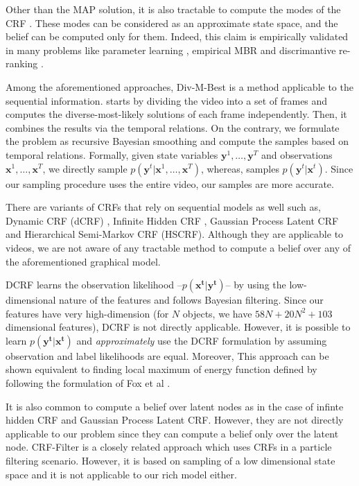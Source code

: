 Other than the MAP solution, it is also tractable to compute the modes of the CRF \cite{divmbest,mbest,mmode}. These modes can be considered as an approximate state space, and the belief can be computed only for them. Indeed, this claim is empirically validated in many problems like parameter learning \cite{mlparam}, empirical MBR \cite{embr} and discrimantive re-ranking \cite{rerank}.

Among the aforementioned approaches, Div-M-Best \cite{divmbest} is a method applicable to the sequential information. \cite{divmbest} starts by dividing the video into a set of frames and computes the diverse-most-likely solutions of each frame independently. Then, it combines the results via the temporal relations. On the contrary, we formulate the problem as recursive Bayesian smoothing and compute the samples based on temporal relations. Formally, given state variables $\mathbf{y}^1,\ldots,\mathbf{y}^T$ and observations $\mathbf{x}^1,\ldots,\mathbf{x}^T$, we directly sample $p(\mathbf{y}^t|\mathbf{x}^1,\ldots,\mathbf{x}^T)$, whereas, \cite{divmbest} samples $p(\mathbf{y}^t|\mathbf{x}^t)$. Since our sampling procedure uses the entire video, our samples are more accurate.

There are variants of CRFs that rely on sequential models as well such as, Dynamic CRF (dCRF) \cite{dcrf}, Infinite Hidden CRF \cite{ihcrf}, Gaussian Process Latent CRF \cite{gpcrf} and Hierarchical Semi-Markov CRF (HSCRF). Although they are applicable to videos, we are not aware of any tractable method to compute a belief over any of the aforementioned graphical model.

DCRF \cite{ddcrf} learns the observation likelihood --$p(\mathbf{x^t}|\mathbf{y^t})$-- by using the low-dimensional nature of the features and follows Bayesian filtering. Since our features have very high-dimension (for $N$ objects, we have $58N+20N^2+103$ dimensional features), DCRF \cite{ddcrf} is not directly applicable. However, it is possible to learn $p(\mathbf{y^t}|\mathbf{x^t})$ and \emph{approximately} use the DCRF formulation by assuming observation and label likelihoods are equal. Moreover, This approach can be shown equivalent to finding local maximum of energy function defined by \cite{hemaIJRR} following the formulation of Fox et al \cite{foxThesis}.

It is also common to compute a belief over latent nodes as in the case of infinte hidden CRF \cite{ihcrf} and Gaussian Process Latent CRF\cite{gpcrf}. However, they are not directly applicable to our problem since they can compute a belief only over the latent node. CRF-Filter \cite{crffilter} is a closely related approach which uses CRFs in a particle filtering scenario. However, it is based on sampling of a low dimensional state space and it is not applicable to our rich model either.

